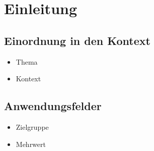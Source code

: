 \section{Einleitung}

\subsection{Einordnung in den Kontext}
\begin{itemize}
	\item Thema
	\item Kontext
\end{itemize}

\subsection{Anwendungsfelder}
\begin{itemize}
	\item Zielgruppe
	\item Mehrwert
\end{itemize}


